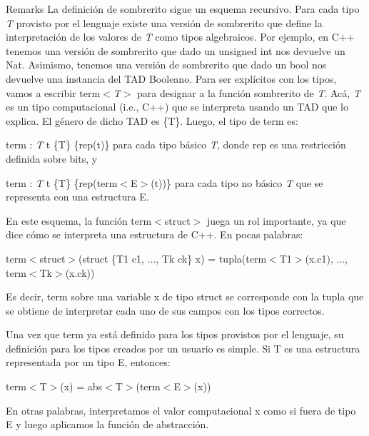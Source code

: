 \begin{DoxyRemark}{\-Remarks}
\-La definición de sombrerito sigue un esquema recursivo. \-Para cada tipo {\itshape \-T\/} provisto por el lenguaje existe una versión de sombrerito que define la interpretación de los valores de {\itshape \-T\/} como tipos algebraicos. \-Por ejemplo, en \-C++ tenemos una versión de sombrerito que dado un unsigned int nos devuelve un \-Nat. \-Asimismo, tenemos una versión de sombrerito que dado un bool nos devuelve una instancia del \-T\-A\-D \-Booleano. \-Para ser explícitos con los tipos, vamos a escribir term$<${\itshape \-T$>$\/} para designar a la función sombrerito de {\itshape \-T\/}. \-Acá, {\itshape \-T\/} es un tipo computacional (i.\-e., \-C++) que se interpreta usando un \-T\-A\-D que lo explica. \-El género de dicho \-T\-A\-D es \{\-T\}. \-Luego, el tipo de term es\-:
\begin{DoxyEnumerate}
\item term \-: {\itshape \-T\/} t  \{\-T\} \{rep(t)\} para cada tipo básico {\itshape \-T\/}, donde rep es una restricción definida sobre bits, y
\item term \-: {\itshape \-T\/} t  \{\-T\} \{rep(term$<$\-E$>$(t))\} para cada tipo no básico {\itshape \-T\/} que se representa con una estructura \-E.
\end{DoxyEnumerate}
\end{DoxyRemark}
\-En este esquema, la función term$<$struct$>$ juega un rol importante, ya que dice cómo se interpreta una estructura de \-C++. \-En pocas palabras\-:
\begin{DoxyItemize}
\item term$<$struct$>$(struct \{\-T1 c1, ..., \-Tk ck\} x) = tupla(term$<$\-T1$>$(x.\-c1), ..., term$<$\-Tk$>$(x.\-ck))
\end{DoxyItemize}

\-Es decir, term sobre una variable x de tipo struct se corresponde con la tupla que se obtiene de interpretar cada uno de sus campos con los tipos correctos.

\-Una vez que term ya está definido para los tipos provistos por el lenguaje, su definición para los tipos creados por un usuario es simple. \-Si \-T es una estructura representada por un tipo \-E, entonces\-:
\begin{DoxyItemize}
\item term$<$\-T$>$(x) = abs$<$\-T$>$(term$<$\-E$>$(x))
\end{DoxyItemize}

\-En otras palabras, interpretamos el valor computacional x como si fuera de tipo \-E y luego aplicamos la función de abstracción. 


